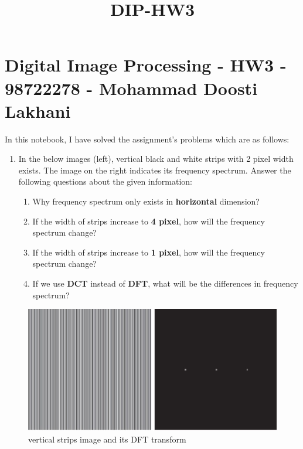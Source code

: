 \documentclass[11pt]{article}
\title{DIP-HW3}
\makeatletter
\def\maxwidth{\ifdim\Gin@nat@width>\linewidth\linewidth
    \else\Gin@nat@width\fi}
\let\Oldincludegraphics\includegraphics
\renewcommand{\includegraphics}[1]{\Oldincludegraphics[width=.8\maxwidth]{#1}}
\providecommand{\tightlist}{%
      \setlength{\itemsep}{0pt}\setlength{\parskip}{0pt}}
\makeatother
\begin{document}
    
    
    \maketitle
    
    

    
    \hypertarget{digital-image-processing---hw3---98722278---mohammad-doosti-lakhani}{%
\section{Digital Image Processing - HW3 - 98722278 - Mohammad Doosti
Lakhani}\label{digital-image-processing---hw3---98722278---mohammad-doosti-lakhani}}

In this notebook, I have solved the assignment's problems which are as
follows:

\begin{enumerate}
\def\labelenumi{\arabic{enumi}.}
\tightlist
\item
  In the below images (left), vertical black and white strips with 2
  pixel width exists. The image on the right indicates its frequency
  spectrum. Answer the following questions about the given information:

  \begin{enumerate}
  \def\labelenumii{\arabic{enumii}.}
  \tightlist
  \item
    Why frequency spectrum only exists in \textbf{horizontal} dimension?
  \item
    If the width of strips increase to \textbf{4 pixel}, how will the
    frequency spectrum change?
  \item
    If the width of strips increase to \textbf{1 pixel}, how will the
    frequency spectrum change?
  \item
    If we use \textbf{DCT} instead of \textbf{DFT}, what will be the
    differences in frequency spectrum?
  \end{enumerate}
\end{enumerate}

\begin{figure}
\centering
\includegraphics{wiki/q01.jpg}
\caption{vertical strips image and its DFT transform}
\end{figure}
\end{document}
